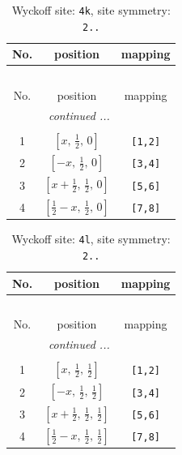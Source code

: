 \documentclass[fleqn,8pt]{jsarticle}
\begin{document}
\renewcommand{\arraystretch}{1.2}
\begin{longtable}{ccc}
\caption{Wyckoff site: {\tt 4k}, site symmetry: {\tt 2..}}
 \\
 \hline \hline
No. & position & mapping \\ \hline \endfirsthead

\multicolumn{2}{l}{\tablename\ \thetable{}} \\
 \hline \hline
No. & position & mapping \\ \hline \endhead

 \hline \hline
\multicolumn{2}{r}{\footnotesize\it continued ...} \\ \endfoot

 \hline \hline
\multicolumn{2}{r}{} \\ \endlastfoot

1 & $\left[ x,\, \frac{1}{2},\, 0 \right]$ & {\tt [1,2]} \\ \hline
2 & $\left[ - x,\, \frac{1}{2},\, 0 \right]$ & {\tt [3,4]} \\ \hline
3 & $\left[ x + \frac{1}{2},\, \frac{1}{2},\, 0 \right]$ & {\tt [5,6]} \\ \hline
4 & $\left[ \frac{1}{2} - x,\, \frac{1}{2},\, 0 \right]$ & {\tt [7,8]} \\
\end{longtable}
\renewcommand{\arraystretch}{1.2}
\begin{longtable}{ccc}
\caption{Wyckoff site: {\tt 4l}, site symmetry: {\tt 2..}}
 \\
 \hline \hline
No. & position & mapping \\ \hline \endfirsthead

\multicolumn{2}{l}{\tablename\ \thetable{}} \\
 \hline \hline
No. & position & mapping \\ \hline \endhead

 \hline \hline
\multicolumn{2}{r}{\footnotesize\it continued ...} \\ \endfoot

 \hline \hline
\multicolumn{2}{r}{} \\ \endlastfoot

1 & $\left[ x,\, \frac{1}{2},\, \frac{1}{2} \right]$ & {\tt [1,2]} \\ \hline
2 & $\left[ - x,\, \frac{1}{2},\, \frac{1}{2} \right]$ & {\tt [3,4]} \\ \hline
3 & $\left[ x + \frac{1}{2},\, \frac{1}{2},\, \frac{1}{2} \right]$ & {\tt [5,6]} \\ \hline
4 & $\left[ \frac{1}{2} - x,\, \frac{1}{2},\, \frac{1}{2} \right]$ & {\tt [7,8]} \\
\end{longtable}
\end{document}
